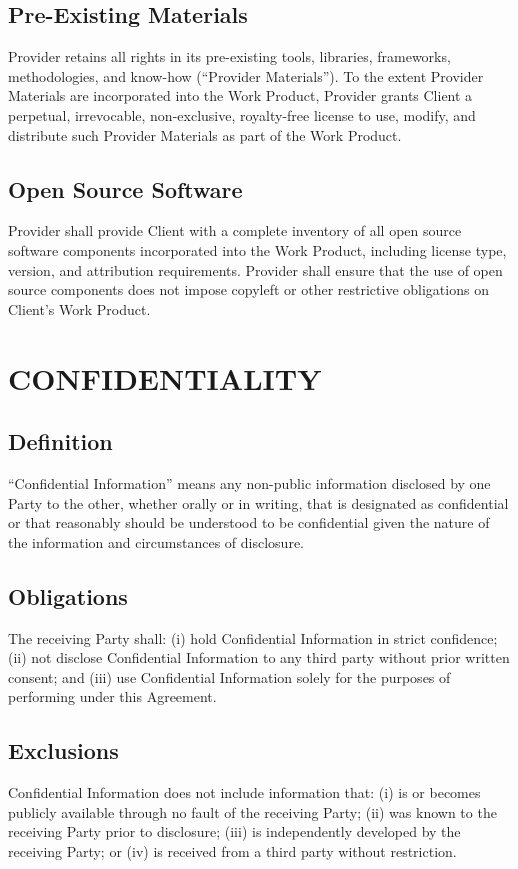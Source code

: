 \documentclass[
    language=english,
    doctype=contract,
    institution=none,
]{../../omnilatex}
\begin{document}
\subsection{Pre-Existing Materials}
Provider retains all rights in its pre-existing tools, libraries, frameworks, methodologies, and know-how (``Provider Materials''). To the extent Provider Materials are incorporated into the Work Product, Provider grants Client a perpetual, irrevocable, non-exclusive, royalty-free license to use, modify, and distribute such Provider Materials as part of the Work Product.

\subsection{Open Source Software}
Provider shall provide Client with a complete inventory of all open source software components incorporated into the Work Product, including license type, version, and attribution requirements. Provider shall ensure that the use of open source components does not impose copyleft or other restrictive obligations on Client's Work Product.

\section{CONFIDENTIALITY}

\subsection{Definition}
``Confidential Information'' means any non-public information disclosed by one Party to the other, whether orally or in writing, that is designated as confidential or that reasonably should be understood to be confidential given the nature of the information and circumstances of disclosure.

\subsection{Obligations}
The receiving Party shall: (i) hold Confidential Information in strict confidence; (ii) not disclose Confidential Information to any third party without prior written consent; and (iii) use Confidential Information solely for the purposes of performing under this Agreement.

\subsection{Exclusions}
Confidential Information does not include information that: (i) is or becomes publicly available through no fault of the receiving Party; (ii) was known to the receiving Party prior to disclosure; (iii) is independently developed by the receiving Party; or (iv) is received from a third party without restriction.
\end{document}
